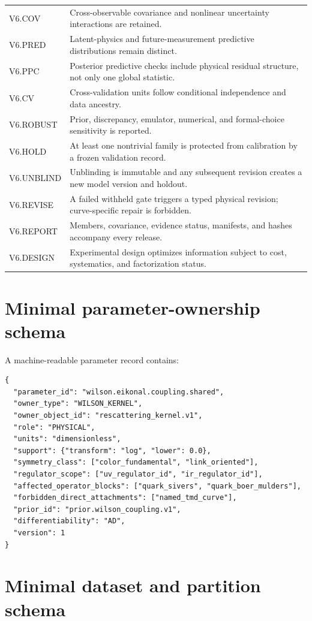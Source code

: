 \documentclass[11pt]{article}
\begin{document}
\begin{longtable}{L{0.16\textwidth}L{0.74\textwidth}}
V6.COV &
Cross-observable covariance and nonlinear uncertainty interactions are
retained.\\
V6.PRED &
Latent-physics and future-measurement predictive distributions remain
distinct.\\
V6.PPC &
Posterior predictive checks include physical residual structure, not only one
global statistic.\\
V6.CV &
Cross-validation units follow conditional independence and data ancestry.\\
V6.ROBUST &
Prior, discrepancy, emulator, numerical, and formal-choice sensitivity is
reported.\\
V6.HOLD &
At least one nontrivial family is protected from calibration by a frozen
validation record.\\
V6.UNBLIND &
Unblinding is immutable and any subsequent revision creates a new model
version and holdout.\\
V6.REVISE &
A failed withheld gate triggers a typed physical revision; curve-specific
repair is forbidden.\\
V6.REPORT &
Members, covariance, evidence status, manifests, and hashes accompany every
release.\\
V6.DESIGN &
Experimental design optimizes information subject to cost, systematics, and
factorization status.\\
\bottomrule
\end{longtable}

\section{Minimal parameter-ownership schema}
\label{app:parameter-schema}

A machine-readable parameter record contains:
\begin{verbatim}
{
  "parameter_id": "wilson.eikonal.coupling.shared",
  "owner_type": "WILSON_KERNEL",
  "owner_object_id": "rescattering_kernel.v1",
  "role": "PHYSICAL",
  "units": "dimensionless",
  "support": {"transform": "log", "lower": 0.0},
  "symmetry_class": ["color_fundamental", "link_oriented"],
  "regulator_scope": ["uv_regulator_id", "ir_regulator_id"],
  "affected_operator_blocks": ["quark_sivers", "quark_boer_mulders"],
  "forbidden_direct_attachments": ["named_tmd_curve"],
  "prior_id": "prior.wilson_coupling.v1",
  "differentiability": "AD",
  "version": 1
}
\end{verbatim}

\section{Minimal dataset and partition schema}
\label{app:data-schema}
\end{document}
